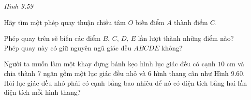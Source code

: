 \begin{exercises}
\begin{questions}[resume=SGK]
\begin{center}
            \textit{Hình 9.59}
        \end{center}

        \begin{questions}
            \item Hãy tìm một phép quay thuận chiều tâm $O$ biến điểm $A$ thành điểm $C$.

            \answerline
            \answerline

            \item Phép quay trên sẽ biến các điểm $B$, $C$, $D$, $E$ lần lượt thành những điểm nào? Phép quay này có giữ nguyên ngũ giác đều $ABCDE$ không?

            \answerline
            \answerline
            \answerline
        \end{questions}

        \item Người ta muốn làm một khay đựng bánh kẹo hình lục giác đều có cạnh $10$ cm và chia thành $7$ ngăn gồm một lục giác đều nhỏ và $6$ hình thang cân như Hình 9.60. Hỏi lục giác đều nhỏ phải có cạnh bằng bao nhiêu để nó có diện tích bằng hai lần diện tích mỗi hình thang?


        \answerline
        \answerline
        \answerline
        \answerline
    \end{questions}
\end{exercises}
